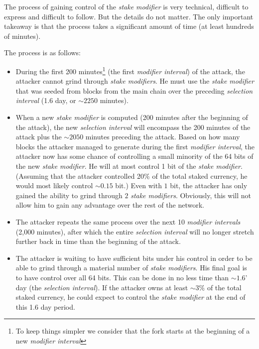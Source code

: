 \documentclass[a4paper,11pt]{article}
\begin{document}
The process of gaining control of the \textit{stake modifier} is very technical, difficult to express and difficult to follow. But the details do not matter. The only important takeaway is that the process takes a significant amount of time (at least hundreds of minutes).

The process is as follows:
\begin{itemize}
\setlength{\itemsep}{0pt}
\item{During the first 200 minutes\footnote{To keep things simpler we consider that the fork starts at the beginning of a new \textit{modifier interval}} (the first \textit{modifier interval}) of the attack, the attacker cannot grind through \textit{stake modifiers}.   He must use the \textit{stake modifier} that was seeded from blocks from the main chain over the preceding \textit{selection interval} (1.6 day, or $\sim2250$ minutes).}
\item{When a new \textit{stake modifier} is computed (200 minutes after the beginning of the attack), the new \textit{selection interval} will encompass the 200 minutes of the attack plus the $\sim2050$ minutes preceding the attack. Based on how many blocks the attacker managed to generate during the first \textit{modifier interval}, the attacker now has some chance of controlling a small minority of the 64 bits of the new \textit{stake modifier}. He will at most control 1 bit of the \textit{stake modifier}. (Assuming that the attacker controlled 20\% of the total staked currency, he would most likely control $\sim0.15$ bit.) Even with $1$ bit, the attacker has only gained the ability to grind through $2$ \textit{stake modifiers}. Obviously, this will not allow him to gain any advantage over the rest of the network.}
\item{The attacker repeats the same process over the next 10 \textit{modifier intervals} (2,000 minutes), after which the entire \textit{selection interval} will no longer stretch further back in time than the beginning of the attack.}
\item{The attacker is waiting to have sufficient bits under his control in order to be able to grind through a material number of \textit{stake modifiers}. His final goal is to have control over all 64 bits. This can be done in no less time than $\sim1.6$' day (the \textit{selection interval}). If the attacker owns at least $\sim3\%$ of the total staked currency, he could expect to control the \textit{stake modifier} at the end of this 1.6 day period.}
\end{itemize}
\end{document}
